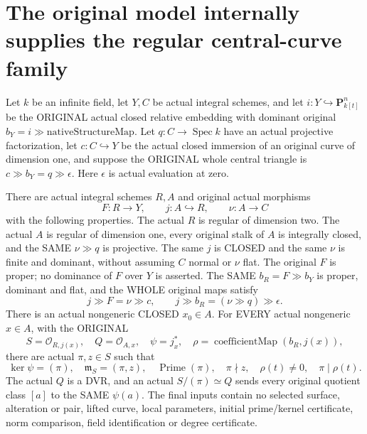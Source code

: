 \section{The original model internally supplies the regular central-curve family}

\begin{theorem}
\label{thm:pl-gauss-original-model-regular-central-curve}
\leanok
Let $k$ be an infinite field, let $Y,C$ be actual integral schemes,
and let $i:Y\hookrightarrow\mathbf P^n_{k[t]}$ be the ORIGINAL actual
closed relative embedding with dominant original
$b_Y=i\gg\mathrm{nativeStructureMap}$. Let $q:C\to\operatorname{Spec}k$
have an actual projective factorization, let $c:C\hookrightarrow Y$
be the actual closed immersion of an original curve of dimension one,
and suppose the ORIGINAL whole central triangle is
$c\gg b_Y=q\gg\epsilon$. Here $\epsilon$ is actual evaluation at zero.

There are actual integral schemes $R,A$ and original actual morphisms
\[
 F:R\to Y,\qquad j:A\hookrightarrow R,\qquad \nu:A\to C
\]
with the following properties. The actual $R$ is regular of dimension
two. The actual $A$ is regular of dimension one, every original stalk
of $A$ is integrally closed, and the SAME $\nu\gg q$ is projective.
The same $j$ is CLOSED and the same $\nu$ is finite and dominant,
without assuming $C$ normal or $\nu$ flat. The original $F$ is proper;
no dominance of $F$ over $Y$ is asserted. The SAME
$b_R=F\gg b_Y$ is proper, dominant and flat, and the WHOLE original
maps satisfy
\[
 j\gg F=\nu\gg c,\qquad
 j\gg b_R=(\nu\gg q)\gg\epsilon.
\]
There is an actual nongeneric CLOSED $x_0\in A$. For EVERY actual
nongeneric $x\in A$, with the ORIGINAL
\[
 S=\mathcal O_{R,j(x)},\quad Q=\mathcal O_{A,x},\quad
 \psi=j_x^*,\quad \rho=\operatorname{coefficientMap}(b_R,j(x)),
\]
there are actual $\pi,z\in S$ such that
\[
 \ker\psi=(\pi),\quad\mathfrak m_S=(\pi,z),\quad
 \operatorname{Prime}(\pi),\quad\pi\nmid z,\quad
 \rho(t)\ne0,\quad\pi\mid\rho(t).
\]
The actual $Q$ is a DVR, and an actual $S/(\pi)\simeq Q$ sends
every original quotient class $[a]$ to the SAME $\psi(a)$.
The final inputs contain no selected surface, alteration or pair,
lifted curve, local parameters, initial prime/kernel certificate,
norm comparison, field identification or degree certificate.
\end{theorem}
